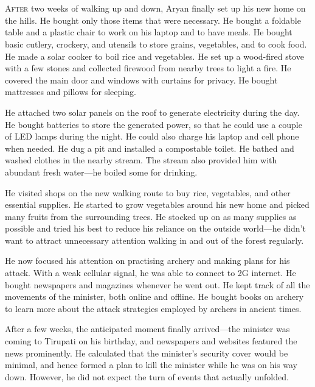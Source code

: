 \chapter{}

\lettrine{A}{fter} two weeks of walking up and down, Aryan finally set up his
new home on the hills. He bought only those items that were necessary. He bought
a foldable table and a plastic chair to work on his laptop and to have meals. He bought
basic cutlery, crockery, and utensils to store grains, vegetables, and to
cook food. He made a solar cooker to boil rice and vegetables. He set up a
wood-fired stove with a few stones and collected firewood from nearby trees to
light a fire. He covered the main door and windows with curtains for privacy. He bought
mattresses and pillows for sleeping.

He attached two solar panels on the roof to generate electricity during the
day. He bought batteries to store the generated power, so that he could
use a couple of LED lamps during the night. He could also charge his
laptop and cell phone when needed. He dug a pit and installed a
compostable toilet. He bathed and washed clothes in the nearby stream. The
stream also provided him with abundant fresh water—he boiled some for drinking.

He visited shops on the new walking route to buy rice, vegetables, and other essential
supplies. He started to grow vegetables around his new home and picked many fruits
from the surrounding trees. He stocked up on as many supplies as possible and tried his
best to reduce his reliance on the outside world—he didn't want to attract
unnecessary attention walking in and out of the forest regularly.

He now focused his attention on practising archery and making plans for his
attack. With a weak cellular signal, he was able to connect to 2G internet. He
bought newspapers and magazines whenever he went out. He kept track of all the
movements of the minister, both online and offline. He bought books on archery to
learn more about the attack strategies employed by archers in ancient times.

After a few weeks, the anticipated moment finally arrived—the minister was
coming to Tirupati on his birthday, and newspapers and websites featured the news
prominently. He calculated that the minister's security cover would be minimal,
and hence formed a plan to kill the minister while he was on his way down. However,
he did not expect the turn of events that actually unfolded.